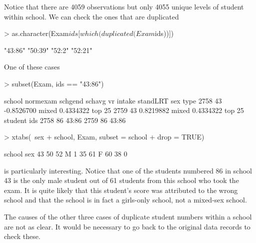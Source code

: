 \documentclass[12pt]{article}
\begin{document}
Notice that there are 4059 observations but only 4055 unique levels of
student within school.  We can check the ones that are duplicated

\begin{Schunk}
\begin{Sinput}
> as.character(Exam$ids[which(duplicated(Exam$ids))])
\end{Sinput}
\begin{Soutput}
[1] "43:86" "50:39" "52:2"  "52:21"
\end{Soutput}
\end{Schunk}

One of these cases
\begin{Schunk}
\begin{Sinput}
> subset(Exam, ids == "43:86")
\end{Sinput}
\begin{Soutput}
     school   normexam schgend    schavg      vr  intake   standLRT sex type
2758     43 -0.8526700   mixed 0.4334322 top 25%
2759     43  0.8219882   mixed 0.4334322 top 25%
     student   ids
2758      86 43:86
2759      86 43:86
\end{Soutput}
\begin{Sinput}
> xtabs(~sex + school, Exam, subset = school %
+     drop = TRUE)
\end{Sinput}
\begin{Soutput}
   school
sex 43 50 52
  M  1 35 61
  F 60 38  0
\end{Soutput}
\end{Schunk}
is particularly interesting.  Notice that one of the students
numbered 86 in school 43 is the only male student out of 61 students
from this school who took the exam.  It is quite likely that this
student's score was attributed to the wrong school and that the school
is in fact a girls-only school, not a mixed-sex school.

The causes of the other three cases of duplicate student numbers
within a school are not as clear.  It would be necessary to go back
to the original data records to check these.
\end{document}
